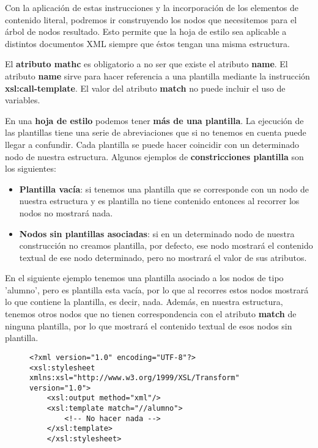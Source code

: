Con la aplicación de estas instrucciones y la incorporación de los elementos de contenido literal, podremos ir construyendo los nodos que necesitemos para el árbol de nodos resultado. Esto permite que la hoja de estilo sea aplicable a distintos documentos XML siempre que éstos tengan una misma estructura.

El \textbf{atributo mathc} es obligatorio a no ser que existe el atributo \textbf{name}. El atributo \textbf{name} sirve para hacer referencia a una plantilla mediante la instrucción \textbf{xsl:call-template}. El valor del atributo \textbf{match} no puede incluir el uso de variables.

En una \textbf{hoja de estilo} podemos tener \textbf{más de una plantilla}. La ejecución de las plantillas tiene una serie de abreviaciones que si no tenemos en cuenta puede llegar a confundir. Cada plantilla se puede hacer coincidir con un determinado nodo de nuestra estructura. Algunos ejemplos de \textbf{constricciones plantilla} son los siguientes:

\begin{itemize}
    \item \textbf{Plantilla vacía}: si tenemos una plantilla que se corresponde con un nodo de nuestra estructura y es plantilla no tiene contenido entonces al recorrer los nodos no mostrará nada.
    \item \textbf{Nodos sin plantillas asociadas}: si en un determinado nodo de nuestra construcción no creamos plantilla, por defecto, ese nodo mostrará el contenido textual de ese nodo determinado, pero no mostrará el valor de sus atributos.
\end{itemize}

En el siguiente ejemplo tenemos una plantilla asociado a los nodos de tipo 'alumno', pero es plantilla esta vacía, por lo que al recorres estos nodos mostrará lo que contiene la plantilla, es decir, nada. Además, en nuestra estructura, tenemos otros nodos que no tienen correspondencia con el atributo \textbf{match} de ninguna plantilla, por lo que mostrará el contenido textual de esos nodos sin plantilla.

\begin{figure}[H]
    \begin{tcolorbox}[sharp corners, colback=yellow!30, colframe=white!20]
        \scriptsize
\begin{verbatim}
<?xml version="1.0" encoding="UTF-8"?>
<xsl:stylesheet xmlns:xsl="http://www.w3.org/1999/XSL/Transform" version="1.0">
    <xsl:output method="xml"/>
    <xsl:template match="//alumno">
        <!-- No hacer nada -->
    </xsl:template>
    </xsl:stylesheet>
\end{verbatim}
    \end{tcolorbox}
\end{figure}

